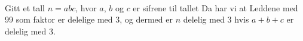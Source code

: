 




\opgt 


\\
Gitt et tall $n=abc $, hvor $ a $, $ b $ og $ c $ er sifrene til tallet 
Da har vi at
Leddene med 99 som faktor er delelige med 3, og dermed er $ n $ delelig med 3 hvis $ a+b+c $ er delelig med 3.



